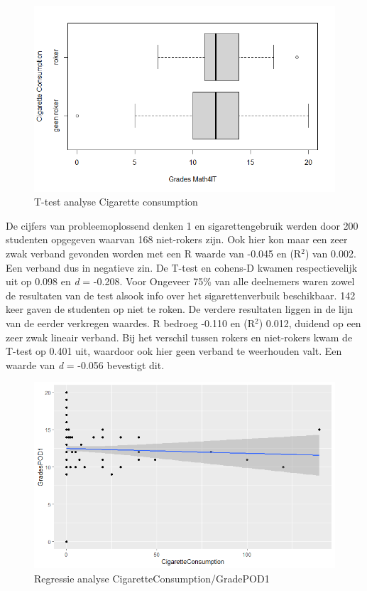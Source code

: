 \documentclass{hogent-article}
\begin{document}
\begin{figure}[ht]
    \begin{center}
        \includegraphics[width=\columnwidth]{CigMath4IT.png}
    \end{center}
    \caption{T-test analyse Cigarette consumption}
    \label{T-test analyse Cigarette consumption}
\end{figure}

De cijfers van probleemoplossend denken 1 en sigarettengebruik werden door 200 studenten opgegeven waarvan 168 niet-rokers zijn. Ook hier kon maar een zeer zwak verband gevonden worden met een R waarde van -0.045 en (R$^{2}$) van 0.002. Een verband dus in negatieve zin. De T-test en cohens-D kwamen respectievelijk uit op 0.098 en \textit{d} = -0.208.
Voor Ongeveer 75\% van alle deelnemers waren zowel de resultaten van de test alsook info over het sigarettenverbuik beschikbaar. 142 keer gaven de studenten op niet te roken. De verdere resultaten liggen in de lijn van de eerder verkregen waardes. R bedroeg -0.110 en (R$^{2}$) 0.012, duidend op een zeer zwak lineair verband. Bij het verschil tussen rokers en niet-rokers kwam de T-test op 0.401 uit, waardoor ook hier geen verband te weerhouden valt. Een waarde van \textit{d} = -0.056 bevestigt dit.



\begin{figure}[ht]
    \begin{center}
        \includegraphics[width=\columnwidth]{CigPOD.png}
    \end{center}
    \caption{Regressie analyse CigaretteConsumption/GradePOD1}
    \label{Regressie analyse CigaretteConsumption/GradePOD1}
\end{figure}
\end{document}
